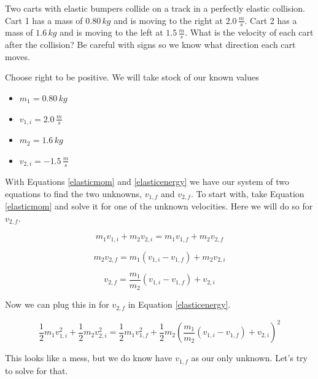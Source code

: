 \documentclass[12pt]{book}
\begin{document}
\begin{exampleblock}

Two carts with elastic bumpers collide on a track in a perfectly elastic collision. Cart 1 has a mass of $0.80 \, kg$ and is moving to the right at $2.0 \, \frac{m}{s}$. Cart 2 has a mass of $1.6 \, kg$ and is moving to the left at $1.5 \, \frac{m}{s}$. What is the velocity of each cart after the collision? Be careful with signs so we know what direction each cart moves.

\hspace{10pt}

Choose right to be positive. We will take stock of our known values

\begin{itemize}
\item $m_1 = 0.80 \, kg$
\item $v_{1,i} = 2.0 \, \frac{m}{s}$
\item $m_2 = 1.6 \, kg$ 
\item $v_{2,i} = -1.5 \, \frac{m}{s}$
\end{itemize}

With Equations \ref{elasticmom} and \ref{elasticenergy} we have our system of two equations to find the two unknowns, $v_{1,f}$ and $v_{2,f}$. To start with, take Equation \ref{elasticmom} and solve it for one of the unknown velocities. Here we will do so for $v_{2,f}$.

\begin{equation}
m_1 v_{1,i} + m_2 v_{2,i} = m_1 v_{1,f} + m_2 v_{2,f}
\end{equation}

\begin{equation}
m_2 v_{2,f} = m_1 (v_{1,i} - v_{1,f}) + m_2 v_{2,i}
\end{equation}

\begin{equation}
v_{2,f} = \frac{m_1}{m_2} (v_{1,i} - v_{1,f}) + v_{2,i}
\end{equation}

Now we can plug this in for $v_{2,f}$ in Equation \ref{elasticenergy}.

\begin{equation}
\frac{1}{2} m_1 v_{1,i}^2 + \frac{1}{2} m_2 v_{2,i}^2 = \frac{1}{2} m_1 v_{1,f}^2 + \frac{1}{2} m_2 \left( \frac{m_1}{m_2}(v_{1,i} - v_{1,f}) + v_{2,i} \right)^2
\end{equation}

This looks like a mess, but we do know have $v_{1,f}$ as our only unknown. Let's try to solve for that.


\end{exampleblock}
\end{document}
